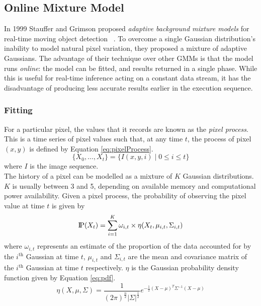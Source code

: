\subsection{Online Mixture Model}
\label{sec:OMM}
\indent \indent
In 1999 Stauffer and Grimson proposed \textit{adaptive background mixture models} for real-time moving object detection ~\cite{Stauffer}. To overcome a single Gaussian distribution's inability to model natural pixel variation, they proposed a mixture of adaptive Gaussians. The advantage of their technique over other GMMs is that the model runs \textit{online}: the model can be fitted, and results returned in a single phase. While this is useful for real-time inference acting on a constant data stream, it has the disadvantage of producing less accurate results earlier in the execution sequence.
\subsubsection{Fitting}
\indent \indent
For a particular pixel, the values that it records are known as the \textit{pixel process}. This is a time series of pixel values such that, at any time $t$, the process of pixel $(x,y)$ is defined by Equation \ref{eq:pixelProcess}.
\begin{equation}
    \label{eq:pixelProcess}
    \{X_0, \ldots, X_t\} = \{I(x,y,i) \; | \; 0 \leq i \leq t\}
\end{equation}
where $I$ is the image sequence.
\smallskip \\ \indent
The history of a pixel can be modelled as a mixture of $K$ Gaussian distributions. $K$ is usually between 3 and 5, depending on available memory and computational power availability. Given a pixel process, the probability of observing the pixel value at time $t$ is given by
\begin{equation}
    \text{I\kern-0.15em P} (X_t) = \sum^K_{i=1} \omega_{i,t} \times \eta(X_t, \mu_{i,t}, \Sigma_{i,t})
\end{equation}
where $\omega_{i,t}$ represents an estimate of the proportion of the data accounted for by the $i^{\text{th}}$ Gaussian at time $t$, $\mu_{i,t}$ and $\Sigma_{i,t}$ are the mean and covariance matrix of the $i^{\text{th}}$ Gaussian at time $t$ respectively. $\eta$ is the Gaussian probability density function given by Equation \ref{eq:pdf}.
\begin{equation}
    \label{eq:pdf}
    \eta (X, \mu, \Sigma) = \frac{1}{(2\pi)^\frac{n}{2} |\Sigma|^\frac{1}{2}} e^{-\frac{1}{2} (X - \mu)^T \Sigma^{-1} (X - \mu)}
\end{equation}
